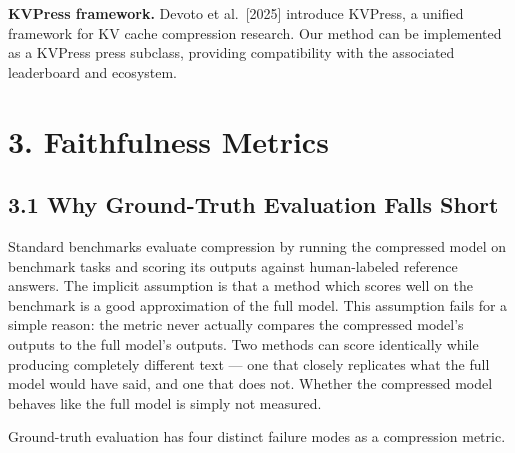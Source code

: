 \documentclass[10pt,letterpaper]{article}
\begin{document}
\textbf{KVPress framework.} Devoto et al.~{[}2025{]} introduce KVPress,
a unified framework for KV cache compression research. Our method can be
implemented as a KVPress press subclass, providing compatibility with
the associated leaderboard and ecosystem.

\hypertarget{faithfulness-metrics}{%
\section{3. Faithfulness Metrics}\label{faithfulness-metrics}}

\hypertarget{why-ground-truth-evaluation-falls-short}{%
\subsection{3.1 Why Ground-Truth Evaluation Falls
Short}\label{why-ground-truth-evaluation-falls-short}}

Standard benchmarks evaluate compression by running the compressed model
on benchmark tasks and scoring its outputs against human-labeled
reference answers. The implicit assumption is that a method which scores
well on the benchmark is a good approximation of the full model. This
assumption fails for a simple reason: the metric never actually compares
the compressed model's outputs to the full model's outputs. Two methods
can score identically while producing completely different text --- one
that closely replicates what the full model would have said, and one
that does not. Whether the compressed model behaves like the full model
is simply not measured.

Ground-truth evaluation has four distinct failure modes as a compression metric.
\end{document}
